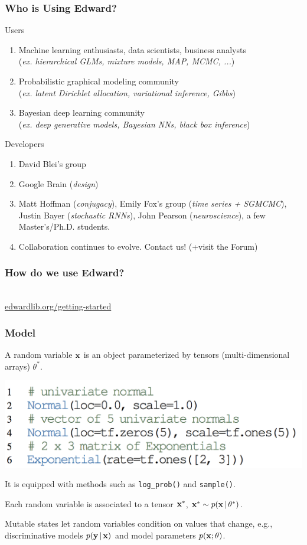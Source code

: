 \documentclass[10pt,
               xcolor={usenames,dvipsnames},
               hyperref={colorlinks,linktoc=all,citecolor=Plum,linkcolor=MidnightBlue,urlcolor=MidnightBlue},noamssymb]{beamer}
\begin{document}
\begin{frame}
\frametitle{Who is Using Edward?}
{\large Users}
\begin{enumerate}
\item
Machine learning enthusiasts, data scientists, business analysts \\
(\emph{ex. hierarchical GLMs, mixture models, MAP, MCMC, ...})
\item
Probabilistic graphical modeling community \\
(\emph{ex. latent Dirichlet allocation, variational inference, Gibbs})
\item
Bayesian deep learning community \\
(\emph{ex. deep generative models, Bayesian NNs, black box inference})
\end{enumerate}

{\large Developers}
\begin{enumerate}
\item
David Blei's group
\item
Google Brain
(\emph{design})
\item
Matt Hoffman (\emph{conjugacy}),
Emily Fox's group
(\emph{time series + SGMCMC}),
Justin Bayer (\emph{stochastic RNNs}),
John Pearson (\emph{neuroscience}),
a few Master's/Ph.D. students.
\item
Collaboration continues to evolve. Contact us! (+visit the Forum)
\end{enumerate}
\end{frame}

\begin{frame}
\frametitle{How do we use Edward?}
\vspace{10ex}
\begin{center}
\gray{\Large [Demo]} \\[3ex]
{\large \url{edwardlib.org/getting-started}}
\end{center}
\end{frame}

\begin{frame}
\frametitle{Model}
A random variable $\boldsymbol{\mathbf{x}}$ is an object parameterized by tensors
(multi-dimensional arrays) $\theta^*$.

\vspace{-1.0ex}
\includegraphics[height=0.20\textwidth]{img/random_variables.png}

It is equipped with methods such as \texttt{log\_prob()} and \texttt{sample()}.

Each random variable is associated to a tensor $\boldsymbol{\mathbf{x}}^*$, $\boldsymbol{\mathbf{x}}^*\sim p(\boldsymbol{\mathbf{x}}\,|\,\theta^*)$.

Mutable states let random variables condition on values that
change, e.g., discriminative models $p(\boldsymbol{\mathbf{y}}\,|\,\boldsymbol{\mathbf{x}})$ and model
parameters $p(\boldsymbol{\mathbf{x}}; \theta)$.
\end{frame}
\end{document}
